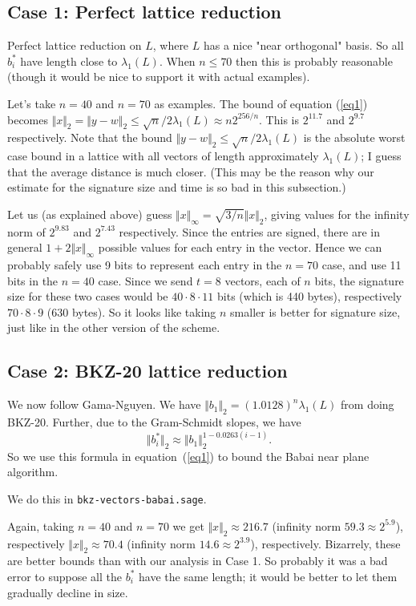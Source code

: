 \documentclass{llncs}
\begin{document}
\subsection{Case 1: Perfect lattice reduction}
Perfect lattice reduction on $L$, where $L$ has a nice "near orthogonal" basis. So all $b_i^*$ have length close to $\lambda_1(L)$. When $n \le 70$ then this is probably reasonable (though it would be nice to support it with actual examples).

Let's take $n=40$ and $n=70$ as examples.
The bound of equation (\ref{eq1}) becomes $\Vert x \Vert_2 =  \Vert y - w \Vert_2 \le \sqrt{n}/2 \lambda_1(L) \approx n 2^{256/n}$.
This is $2^{11.7}$ and $2^{9.7}$ respectively.
Note that the bound $\Vert y - w \Vert_2 \le \sqrt{n}/2 \lambda_1(L)$ is the absolute worst case bound in a lattice with all vectors of length approximately $\lambda_1(L)$; I guess that the average distance is much closer. (This may be the reason why our estimate for the signature size and time is so bad in this subsection.)

Let us (as explained above) guess $\Vert x \Vert_\infty = \sqrt{3/n} \Vert x \Vert_2 $, giving values for the infinity norm of $2^{9.83}$ and $2^{7.43}$ respectively.
Since the entries are signed, there are in general $1 + 2 \Vert x \Vert_\infty $ possible values for each entry in the vector. Hence we can probably safely use 9 bits to represent each entry in the $n=70$ case, and use 11 bits in the $n=40$ case.
Since we send $t=8$ vectors, each of $n$ bits, the signature size for these two cases would be
$40 \cdot 8 \cdot 11 $ bits (which is 440 bytes), respectively
 $70 \cdot 8 \cdot 9$ (630 bytes).
So it looks like taking $n$ smaller is better for signature size, just like in the other version of the scheme. 


\subsection{Case 2: BKZ-20 lattice reduction}
We now follow Gama-Nguyen.
We have $\Vert b_1 \Vert_2 = (1.0128)^n \lambda_1(L)$ from doing BKZ-20.
Further, due to the Gram-Schmidt slopes, we have
\[
   \Vert b_i^* \Vert_2 \approx \Vert b_1 \Vert_2^{1 - 0.0263(i-1)}.
\]
So we use this formula in equation~(\ref{eq1}) to bound the Babai near plane algorithm.

We do this in \texttt{bkz-vectors-babai.sage}.

Again, taking $n=40$ and $n=70$ we get
$\Vert x \Vert_2 \approx 216.7$ (infinity norm $59.3 \approx 2^{5.9}$), respectively
$\Vert x \Vert_2 \approx 70.4$ (infinity norm $14.6 \approx 2^{3.9} $), respectively.
Bizarrely, these are better bounds than with our analysis in Case 1. So probably it was a bad error to suppose all the $b_i^*$ have the same length; it would be better to let them gradually decline in size.
\end{document}

